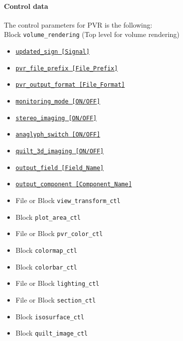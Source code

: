 \paragraph{Control data}
The control parameters for PVR is the following:
\\
%
Block \verb|volume_rendering| (Top level for volume rendering)
\\
\label{href_i:volume_rendering}
\begin{itemize}
	\item \hyperref[href_t:updated_sign]
			{\tt updated\_sign    [Signal]}
	\item \hyperref[href_t:pvr_file_prefix]
			{\tt pvr\_file\_prefix    [File\_Prefix]}
	\item \hyperref[href_t:pvr_output_format]
			{\tt pvr\_output\_format    [File\_Format]}
	\item \hyperref[href_t:monitoring_mode]
			{\tt monitoring\_mode       [ON/OFF]}
%
	\item \hyperref[href_t:stereo_imaging]
			{\tt stereo\_imaging          [ON/OFF]}
	\item \hyperref[href_t:anaglyph_switch]
			{\tt anaglyph\_switch         [ON/OFF]}
	\item \hyperref[href_t:quilt_3d_imaging]
			{\tt quilt\_3d\_imaging       [ON/OFF]}
%
	\item \hyperref[href_t:output_field]
			{\tt output\_field            [Field\_Name]}
	\item \hyperref[href_t:output_component]
			{\tt output\_component       [Component\_Name]}
%
    \item File or Block \verb|view_transform_ctl|
			\label{href_i:view_transform_ctl}
    \item Block \verb|plot_area_ctl|
			\label{href_i:plot_area_ctl}
    \item File or Block \verb|pvr_color_ctl|
			\label{href_i:pvr_color_ctl}
    \item Block \verb|colormap_ctl|
			\label{href_i:colormap_ctl}
    \item Block \verb|colorbar_ctl|
			\label{href_i:colorbar_ctl}
    \item File or Block \verb|lighting_ctl|
			\label{href_i:lighting_ctl}
%
    \item File or Block \verb|section_ctl|
			\label{href_i:section_ctl}
    \item Block        \verb|isosurface_ctl|
			\label{href_i:isosurface_ctl}
%
    \item Block        \verb|quilt_image_ctl|

\end{itemize}
